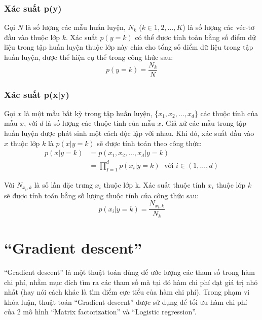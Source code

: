 \subsubsection{Xác suất p(y)}
Gọi $N$ là số lượng các mẫu huấn luyện, $N_k$ ($k \in {1,2,\dots,K}$) là số lượng các véc-tơ đầu vào thuộc lớp $k$. Xác suất $p(y=k)$ có thể được tính toàn bằng số điểm dữ liệu trong tập huấn luyện thuộc lớp này chia cho tổng số điểm dữ liệu trong tập huấn luyện, được thể hiện cụ thể trong công thức sau:
\begin{equation}
    \label{eq:2.3_p(y)}
    p(y=k) = \frac{N_k}{N}
\end{equation}

\subsubsection{Xác suất p(x|y)}
Gọi $x$ là một mẫu bất kỳ trong tập huấn luyện, \{$x_1, x_2, \dots, x_d$\} các thuộc tính của mẫu $x$, với $d$ là số lượng các thuộc tính của mẫu $x$. Giả xử các mẫu trong tập huấn luyện được phát sinh một cách độc lập với nhau. Khi đó, xác suất đầu vào $x$ thuộc lớp $k$ là $p(x|y=k)$ sẽ được tính toán theo công thức:
\begin{equation}
    \label{eq:2.3_p(x|y)}
    \begin{split}
        p(x|y=k) &= p(x_1, x_2, \dots, x_d|y=k)\\
        &= \prod_{I=1}^{d} p(x_i|y=k) \; \text{ với } i \in (1,\dots,d)
    \end{split}
\end{equation}

Với $N_{x_i, k}$ là số lần đặc trưng $x_i$ thuộc lớp k. Xác suất thuộc tính $x_i$ thuộc lớp $k$ sẽ được tính toán bằng số lượng thuộc tính của
công thức sau:
\begin{equation}
    p(x_i|y=k) = \frac{N_{x_i, k}}{N_k}
\end{equation}

\section{``Gradient descent''}
\label{section:Gradientdescent}
``Gradient descent'' là một thuật toán dùng để ước lượng các tham số trong hàm chi phí, nhằm mục đích tìm ra các tham số mà tại đó hàm chi phí đạt giá trị nhỏ nhất (hay nói cách khác là tìm điểm cực tiểu của hàm chi phí). Trong phạm vi khóa luận, thuật toán ``Gradient descent'' được sử dụng để tối ưu hàm chi phí của 2 mô hình ``Matrix factorization'' và ``Logistic regression''.
